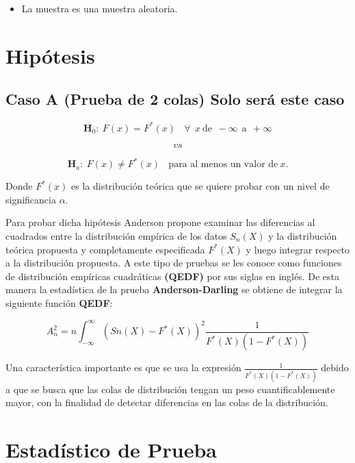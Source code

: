 \documentclass[
  a4paper,
  oneside,
  openany]{book}
\providecommand{\tightlist}{%
  \setlength{\itemsep}{0pt}\setlength{\parskip}{0pt}}
\begin{document}
\begin{itemize}
\tightlist
\item
  La muestra es una muestra aleatoria.
\end{itemize}

\hypertarget{hipuxf3tesis-18}{%
\section{Hipótesis}\label{hipuxf3tesis-18}}

\hypertarget{caso-a-prueba-de-2-colas-solo-seruxe1-este-caso}{%
\subsection*{Caso A (Prueba de 2 colas) Solo será este caso}\label{caso-a-prueba-de-2-colas-solo-seruxe1-este-caso}}


\[\textbf{H}_0: \ F(x)=F^*(x) \ \ \ \ \forall\ \ x\  \mbox{de} \ \ -\infty \ \ \mbox{a} \ \  +\infty\]

\[vs\]

\[\textbf{H}_a: \ F(x) \neq F^*(x) \ \ \ \ \mbox{para al menos un  valor de} \  x.\]

Donde \(F^*(x)\) es la distribución teórica que se quiere probar con un nivel de significancia \(\alpha\).

Para probar dicha hipótesis Anderson propone examinar las diferencias al cuadrados entre la distribución empírica de los datos \(S_{n}(X)\) y la distribución teórica propuesta y completamente
especificada \(F^*(X)\) y luego integrar respecto a la distribución propuesta.
A este tipo de pruebas se les conoce como funciones de distribución empíricas cuadráticas \textbf{(QEDF)} por
sus siglas en inglés.
De esta manera la estadística de la prueba \textbf{Anderson-Darling} se obtiene de integrar la
siguiente función \textbf{QEDF}:

\[A_n^2=n \int_{-\infty}^{\infty} (Sn(X)-F^*(X))^2 \frac{1}{F^*(X)(1-F^*(X))}\]

Una característica importante es que se usa la expresión \(\frac{1}{F^*(X)(1-F^*(X))}\)
debido a que se busca que las colas de distribución tengan un peso cuantificablemente mayor, con la finalidad de detectar diferencias en las colas de la distribución.

\hypertarget{estaduxedstico-de-prueba-16}{%
\section{Estadístico de Prueba}\label{estaduxedstico-de-prueba-16}}
\end{document}
